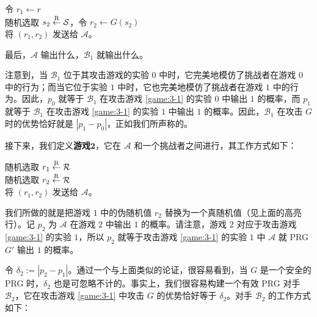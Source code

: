 \vspace*{5pt}

\hspace*{28.5pt} 令 $r_1\leftarrow r$\\
\hspace*{50pt} 随机选取 $s_2\overset{\rm R}\leftarrow\mathcal S$，令 $r_2\leftarrow G(s_2)$\\
\hspace*{50pt} 将 $(r_1,r_2)$ 发送给 $\mathcal A$。

\vspace*{5pt}

\hspace*{5pt} 最后，$\mathcal A$ 输出什么，$\mathcal B_1$ 就输出什么。

\vspace*{10pt}

\noindent
注意到，当 $\mathcal B_1$ 位于其攻击游戏的实验 $0$ 中时，它完美地模仿了挑战者在游戏 $0$ 中的行为；而当它位于实验 $1$ 中时，它也完美地模仿了挑战者在游戏 $1$ 中的行为。因此，$p_0$ 就等于 $\mathcal B_1$ 在攻击游戏 \ref{game:3-1} 的实验 $0$ 中输出 $1$ 的概率，而 $p_1$ 就等于 $\mathcal B_1$ 在攻击游戏 \ref{game:3-1} 的实验 $1$ 中输出 $1$ 的概率。因此，$\mathcal B_1$ 在攻击 $G$ 时的优势恰好就是 $|p_1-p_0|$，正如我们所声称的。

接下来，我们定义\textbf{游戏$\mathbf{2}$}，它在 $\mathcal A$ 和一个挑战者之间进行，其工作方式如下：

\vspace*{10pt}

\hspace*{5pt} 随机选取 $r_1\overset{\rm R}\leftarrow\mathcal R$\\
\hspace*{23pt} \colorbox{gray!50}{随机选取 $r_2\overset{\rm R}\leftarrow\mathcal R$}\\
\hspace*{26pt} 将 $(r_1,r_2)$ 发送给 $\mathcal A$。

\vspace*{10pt}

\noindent
我们所做的就是把游戏 $1$ 中的伪随机值 $r_2$ 替换为一个真随机值（见上面的高亮行）。记 $p_2$ 为 $\mathcal A$ 在游戏 $2$ 中输出 $1$ 的概率。请注意，游戏 $2$ 对应于攻击游戏 \ref{game:3-1} 的实验 $1$，所以 $p_2$ 就等于攻击游戏 \ref{game:3-1} 的实验 $1$ 中 $\mathcal A$ 就 PRG $G'$ 输出 $1$ 的概率。

令 $\delta_2:=|p_2-p_1|$。通过一个与上面类似的论证，很容易看到，当 $G$ 是一个安全的 PRG 时，$\delta_2$ 也是可忽略不计的。事实上，我们很容易构建一个有效 PRG 对手 $\mathcal B_2$，它在攻击游戏 \ref{game:3-1} 中攻击 $G$ 的优势恰好等于 $\delta_2$。对手 $\mathcal B_2$ 的工作方式如下：

